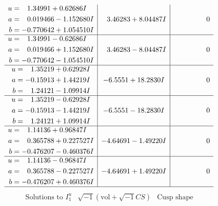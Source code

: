 \documentclass[1p]{elsarticle_modified}
\theoremstyle{definition}
\newcommand{\I}{\sqrt{-1}}
\begin{document}
$$\begin{array}{c|c|c}
\begin{aligned}
u &= \phantom{-}1.34991 + 0.62686 I \\
a &= \phantom{-}0.019466 - 1.152680 I \\
b &= -0.770642 + 1.054510 I\end{aligned}
 & \phantom{-}3.46283 + 8.04487 I & \phantom{-0.000000 } 0 \\ \hline\begin{aligned}
u &= \phantom{-}1.34991 - 0.62686 I \\
a &= \phantom{-}0.019466 + 1.152680 I \\
b &= -0.770642 - 1.054510 I\end{aligned}
 & \phantom{-}3.46283 - 8.04487 I & \phantom{-0.000000 } 0 \\ \hline\begin{aligned}
u &= \phantom{-}1.35219 + 0.62928 I \\
a &= -0.15913 + 1.44219 I \\
b &= \phantom{-}1.24121 - 1.09914 I\end{aligned}
 & -6.5551 + 18.2830 I & \phantom{-0.000000 } 0 \\ \hline\begin{aligned}
u &= \phantom{-}1.35219 - 0.62928 I \\
a &= -0.15913 - 1.44219 I \\
b &= \phantom{-}1.24121 + 1.09914 I\end{aligned}
 & -6.5551 - 18.2830 I & \phantom{-0.000000 } 0 \\ \hline\begin{aligned}
u &= \phantom{-}1.14136 + 0.96847 I \\
a &= \phantom{-}0.365788 + 0.227527 I \\
b &= -0.476207 - 0.460376 I\end{aligned}
 & -4.64691 - 1.49220 I & \phantom{-0.000000 } 0 \\ \hline\begin{aligned}
u &= \phantom{-}1.14136 - 0.96847 I \\
a &= \phantom{-}0.365788 - 0.227527 I \\
b &= -0.476207 + 0.460376 I\end{aligned}
 & -4.64691 + 1.49220 I & \phantom{-0.000000 } 0\\
 \hline 
 \end{array}$$\newpage$$\begin{array}{c|c|c}  
\text{Solutions to }I^u_{1}& \I (\text{vol} + \sqrt{-1}CS) & \text{Cusp shape}\\
 \hline 
\begin{aligned}

\end{aligned}
\end{array}$$
\end{document}
